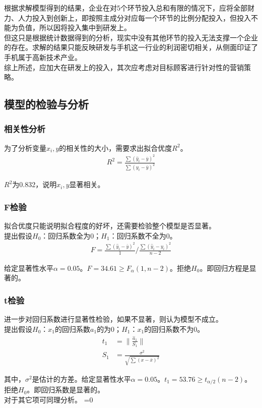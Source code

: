\documentclass{article}
\begin{document}
\par\indent 根据求解模型得到的结果，企业在对5个环节投入总和有限的情况下，应将全部财力、人力投入到创新上，即按照主成分对应每一个环节的比例分配投入，但投入不能为负值，所以因将投入集中到研发上。
\\\indent 但这只是根据统计数据得到的分析，现实中没有其他环节的投入无法支撑一个企业的存在。求解的结果只能反映研发与手机这一行业的利润密切相关，从侧面印证了手机属于高新技术产业。
\\\indent 综上所述，应加大在研发上的投入，其次应考虑对目标顾客进行针对性的营销策略。
\subsection{模型的检验与分析}
\subsubsection{相关性分析}
为了分析变量\(x_i,y\)的相关性的大小，需要求出拟合优度\(R^2\)。
\begin{align}
	R^2=\frac{\sum(\hat{y}_i-\bar{y})^2}{\sum(y_i-\bar{y})^2}
\end{align}
\par\indent\(R^2\)为0.832，说明\(x_i,y\)显著相关。
\subsubsection{F检验}
拟合优度只能说明拟合程度的好坏，还需要检验整个模型是否显著。
\\\indent 提出假设\(H_0\)：回归系数全为0；\(H_1\)：回归系数不全为0。
\begin{align}
	F=\frac{\sum(\hat{y}_i-\bar{y})^2}{1}\Big/\frac{\sum(\hat{y}_i-y_i)^2}{n-2}
\end{align}
\par\indent 给定显著性水平\(\alpha=0.05\)。\(F=34.61\geqslant F_\alpha(1,n-2)\)。拒绝\(H_0\)。即回归方程是显著的。
\subsubsection{t检验}
进一步对回归系数进行显著性检验，如果不显著，则认为模型不成立。
\\\indent 提出假设\(H_0\)：\(x_1\)的回归系数\(a_1\)的为0；\(H_1\)：\(x_1\)的回归系数不为0。
\begin{align}
	t_1&=\lVert\frac{\hat{a}_1}{S_1}\rVert\\
	S_1&=\frac{\sigma^2}{\sqrt{\sum(x-\bar{x})^2}}
\end{align}
\par\indent 其中，\(\sigma^2\)是估计的方差。给定显著性水平\(\alpha=0.05\)。\(t_1=53.76\geqslant t_{\alpha/2}(n-2)\)。拒绝\(H_0\)。即回归系数是显著的。
\\\indent 对于其它项可同理分析。
\ifnum{}=0
	
\end{document}
